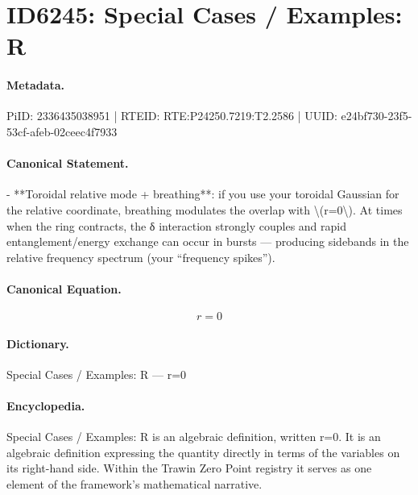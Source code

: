 \section*{ID6245: Special Cases / Examples: R}
\paragraph{Metadata.}
PiID: 2336435038951 | RTEID: RTE:P24250.7219:T2.2586 | UUID: e24bf730-23f5-53cf-afeb-02ceec4f7933

\paragraph{Canonical Statement.}
- **Toroidal relative mode + breathing**: if you use your toroidal Gaussian for the relative coordinate, breathing modulates the overlap with \textbackslash{}(r=0\textbackslash{}). At times when the ring contracts, the δ interaction strongly couples and rapid entanglement/energy exchange can occur in bursts — producing sidebands in the relative frequency spectrum (your “frequency spikes”).

\paragraph{Canonical Equation.}
\[
r=0
\]

\paragraph{Dictionary.}
Special Cases / Examples: R — r=0

\paragraph{Encyclopedia.}
Special Cases / Examples: R is an algebraic definition, written r=0. It is an algebraic definition expressing the quantity directly in terms of the variables on its right-hand side. Within the Trawin Zero Point registry it serves as one element of the framework's mathematical narrative.
